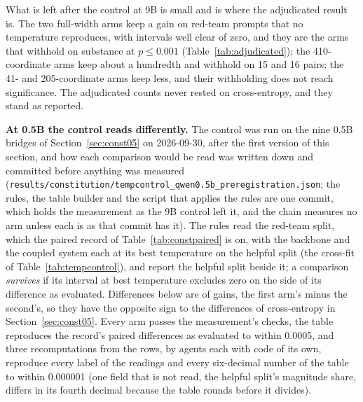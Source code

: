 \documentclass[11pt]{article}
\newcommand{\code}[1]{\texttt{#1}}
\begin{document}
What is left after the control at 9B is small and is where the adjudicated result is.
The two full-width arms keep a gain on red-team prompts that no temperature
reproduces, with intervals well clear of zero, and they are the arms that withhold
on substance at $p \le 0.001$ (Table~\ref{tab:adjudicated}); the 410-coordinate
arms keep about a hundredth and withhold on 15 and 16 pairs; the 41- and
205-coordinate arms keep less, and their withholding does not reach significance.
The adjudicated counts never rested on cross-entropy, and they stand as reported.

\textbf{At 0.5B the control reads differently.} The control was run on the nine
0.5B bridges of Section~\ref{sec:const05} on 2026-09-30, after the first version
of this section, and how each comparison would be read was written down and
committed before anything was measured
(\code{results/\allowbreak{}constitution/\allowbreak{}tempcontrol\_\allowbreak{}qwen0.5b\_\allowbreak{}preregistration.json};
the rules, the table builder and the script that applies the rules are one
commit, which holds the measurement as the 9B control left it, and the chain
measures no arm unless each is as that commit has it).
The rules read the red-team split, which the paired record of
Table~\ref{tab:constpaired} is on, with the backbone and the coupled system each
at its best temperature on the helpful split (the cross-fit of
Table~\ref{tab:tempcontrol}), and report the helpful split beside it; a comparison
\emph{survives} if its interval at best temperature excludes zero on the side of
its difference as evaluated. Differences below are of gains, the first arm's minus
the second's, so they have the opposite sign to the differences of cross-entropy
in Section~\ref{sec:const05}. Every arm passes the measurement's checks, the table
reproduces the record's paired differences as evaluated to within 0.0005, and
three recomputations from the rows, by agents each with code of its own,
reproduce every label of the readings and every six-decimal number of the table
to within 0.000001 (one field that is not read, the helpful split's magnitude
share, differs in its fourth decimal because the table rounds before it
divides).
\end{document}
